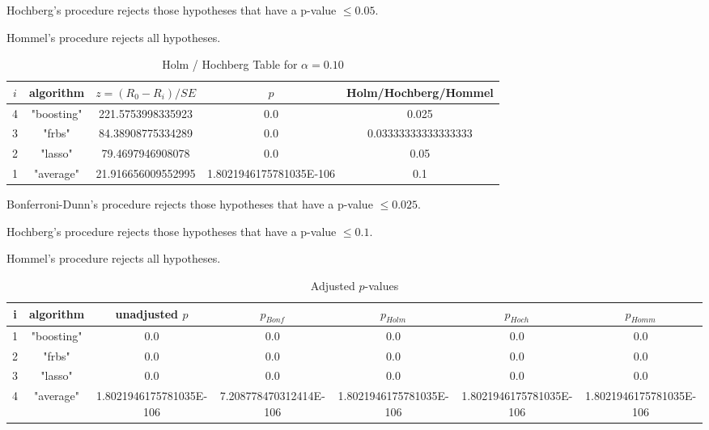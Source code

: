 \documentclass[a4paper,10pt]{article}
\begin{document}
\begin{landscape}
Hochberg's procedure rejects those hypotheses that have a p-value $\le0.05$.


Hommel's procedure rejects all hypotheses.


\begin{table}[!htp]
\centering\tiny
\caption{Holm / Hochberg Table for $\alpha=0.10$}
\begin{tabular}{ccccc}
$i$&algorithm&$z=(R_0 - R_i)/SE$&$p$&Holm/Hochberg/Hommel\\
\hline
4&"boosting"&221.5753998335923&0.0&0.025\\
3&"frbs"&84.38908775334289&0.0&0.03333333333333333\\
2&"lasso"&79.4697946908078&0.0&0.05\\
1&"average"&21.916656009552995&1.8021946175781035E-106&0.1\\
\hline
\end{tabular}
\end{table}
Bonferroni-Dunn's procedure rejects those hypotheses that have a p-value $\le0.025$.


Hochberg's procedure rejects those hypotheses that have a p-value $\le0.1$.


Hommel's procedure rejects all hypotheses.


\begin{table}[!htp]
\centering\tiny
\caption{Adjusted $p$-values}
\begin{tabular}{ccccccc}
i&algorithm&unadjusted $p$&$p_{Bonf}$&$p_{Holm}$&$p_{Hoch}$&$p_{Homm}$\\
\hline
1&"boosting"&0.0&0.0&0.0&0.0&0.0\\
2&"frbs"&0.0&0.0&0.0&0.0&0.0\\
3&"lasso"&0.0&0.0&0.0&0.0&0.0\\
4&"average"&1.8021946175781035E-106&7.208778470312414E-106&1.8021946175781035E-106&1.8021946175781035E-106&1.8021946175781035E-106\\
\hline
\end{tabular}
\end{table}


\end{landscape}
\end{document}
